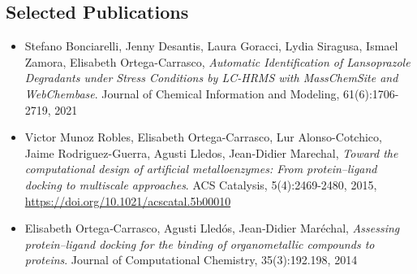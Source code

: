 \subsection*{Selected Publications}

\begin{itemize}

\item[] Stefano Bonciarelli, Jenny Desantis, Laura Goracci, Lydia Siragusa, Ismael Zamora, Elisabeth Ortega-Carrasco, 
    \emph{Automatic Identification of Lansoprazole Degradants under Stress Conditions by LC-HRMS with MassChemSite and WebChembase}. 
    Journal of Chemical Information and Modeling, 61(6):1706-2719, 2021

\item[] Victor Munoz Robles, Elisabeth Ortega-Carrasco, Lur Alonso-Cotchico, Jaime Rodriguez-Guerra, Agusti Lledos, Jean-Didier Marechal, \emph{Toward the computational design of artificial metalloenzymes: 
    From protein–ligand docking to multiscale approaches}. ACS Catalysis, 5(4):2469-2480, 2015,
    \url{https://doi.org/10.1021/acscatal.5b00010}

\item[] Elisabeth Ortega‐Carrasco, Agusti Lledós, Jean‐Didier Maréchal, \emph{Assessing protein–ligand docking for the binding of organometallic compounds to proteins}.
    Journal of Computational Chemistry, 35(3):192.198, 2014



\end{itemize}
